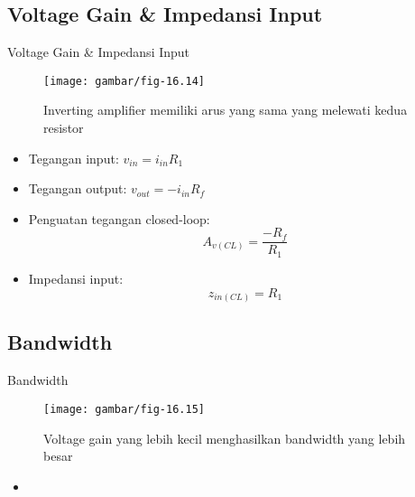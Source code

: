 \subsection{Voltage Gain \& Impedansi Input}
\begin{frame}{Voltage Gain \& Impedansi Input}
	\begin{multicols}{2}
		\begin{figure}
			\centering
			\texttt{[image: gambar/fig-16.14]}
			\caption{Inverting amplifier memiliki arus yang sama yang melewati kedua resistor}
			\label{fig-16.14}
		\end{figure}
	\columnbreak
		\begin{itemize}
			\item Tegangan input: $ v_{in} = i_{in} R_1 $
			\item Tegangan output: $ v_{out} = -i_{in} R_f $
			\item Penguatan tegangan closed-loop:
			\begin{equation}\label{pers.16.3}
				A_{v(CL)} = \frac{-R_f}{R_1}
			\end{equation}
			\item Impedansi input:
			\begin{equation}\label{pers.16.4}
				z_{in(CL)} = R_1
			\end{equation}
		\end{itemize}
	\end{multicols}
\end{frame}

\subsection{Bandwidth}
\begin{frame}{Bandwidth}
	\begin{multicols}{2}
		\begin{figure}
			\centering
			\texttt{[image: gambar/fig-16.15]}
			\caption{Voltage gain yang lebih kecil menghasilkan bandwidth yang lebih besar}
			\label{fig-16.15}
		\end{figure}
	\columnbreak
		\begin{itemize}
			\item 
		\end{itemize}
	\end{multicols}
\end{frame}